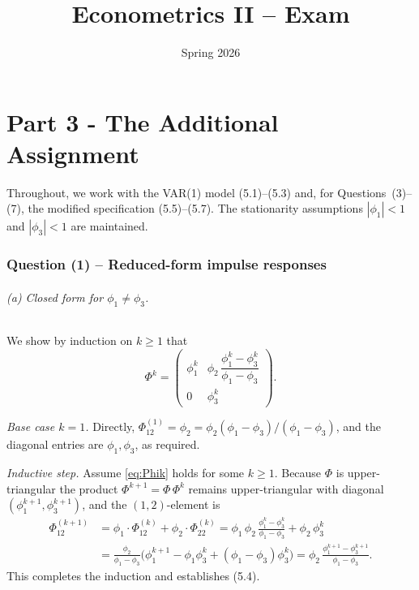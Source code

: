 \documentclass[12pt]{article}
\title{Econometrics II -- Exam}
\date{Spring 2026}
\begin{document}
\maketitle
\part{Part 3 - The Additional Assignment}

Throughout, we work with the VAR(1) model (5.1)--(5.3) and, for Questions~(3)--(7), the modified specification (5.5)--(5.7). The stationarity assumptions $|\phi_1|<1$ and $|\phi_3|<1$ are maintained.

\section*{Question (1) -- Reduced-form impulse responses}

\paragraph{(a) Closed form for $\phi_1\neq\phi_3$.} We show by induction on $k\geq 1$ that
\begin{equation}
\Phi^{k}=\begin{pmatrix} \phi_1^{k} & \phi_2\,\dfrac{\phi_1^{k}-\phi_3^{k}}{\phi_1-\phi_3} \\[4pt] 0 & \phi_3^{k}\end{pmatrix}. \label{eq:Phik}
\end{equation}

\textit{Base case $k=1$.} Directly, $\Phi^{(1)}_{12}=\phi_2=\phi_2(\phi_1-\phi_3)/(\phi_1-\phi_3)$, and the diagonal entries are $\phi_1,\phi_3$, as required.

\textit{Inductive step.} Assume \eqref{eq:Phik} holds for some $k\geq 1$. Because $\Phi$ is upper-triangular the product $\Phi^{k+1}=\Phi\,\Phi^{k}$ remains upper-triangular with diagonal $(\phi_1^{k+1},\phi_3^{k+1})$, and the $(1,2)$-element is
\begin{align*}
\Phi^{(k+1)}_{12} &= \phi_1\cdot\Phi^{(k)}_{12} + \phi_2\cdot\Phi^{(k)}_{22}
= \phi_1\,\phi_2\,\frac{\phi_1^{k}-\phi_3^{k}}{\phi_1-\phi_3} + \phi_2\,\phi_3^{k}\\
&= \frac{\phi_2}{\phi_1-\phi_3}\Big(\phi_1^{k+1}-\phi_1\phi_3^{k}+(\phi_1-\phi_3)\phi_3^{k}\Big)
= \phi_2\,\frac{\phi_1^{k+1}-\phi_3^{k+1}}{\phi_1-\phi_3}.
\end{align*}
This completes the induction and establishes (5.4).
\end{document}
